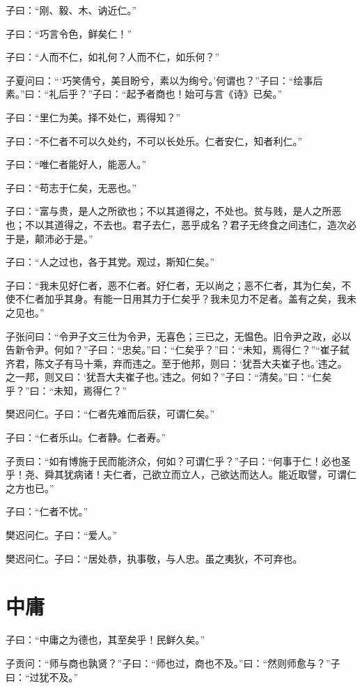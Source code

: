 \documentclass[a5paper]{ctexbook}
\begin{document}
    子曰：“刚、毅、木、讷近仁。”

    子曰：“巧言令色，鲜矣仁！”

    子曰：“人而不仁，如礼何？人而不仁，如乐何？”

    子夏问曰：“‘巧笑倩兮，美目盼兮，素以为绚兮。’何谓也？”子曰：“绘事后素。”曰：“礼后乎？”子曰：“起予者商也！始可与言《诗》已矣。”

    子曰：“里仁为美。择不处仁，焉得知？”

    子曰：“不仁者不可以久处约，不可以长处乐。仁者安仁，知者利仁。”

    子曰：“唯仁者能好人，能恶人。”

    子曰：“苟志于仁矣，无恶也。”

    子曰：“富与贵，是人之所欲也；不以其道得之，不处也。贫与贱，是人之所恶也；不以其道得之，不去也。君子去仁，恶乎成名？君子无终食之间违仁，造次必于是，颠沛必于是。”

    子曰：“人之过也，各于其党。观过，斯知仁矣。”

    子曰：“我未见好仁者，恶不仁者。好仁者，无以尚之；恶不仁者，其为仁矣，不使不仁者加乎其身。有能一日用其力于仁矣乎？我未见力不足者。盖有之矣，我未之见也。”

    子张问曰：“令尹子文三仕为令尹，无喜色；三已之，无愠色。旧令尹之政，必以告新令尹。何如？”子曰：“忠矣。”曰：“仁矣乎？”曰：“未知，焉得仁？”“崔子弑齐君，陈文子有马十乘，弃而违之。至于他邦，则曰：‘犹吾大夫崔子也。’违之。之一邦，则又曰：‘犹吾大夫崔子也。’违之。何如？”子曰：“清矣。”曰：“仁矣乎？”曰：“未知，焉得仁？”

    樊迟问仁。子曰：“仁者先难而后获，可谓仁矣。”

    子曰：“仁者乐山。仁者静。仁者寿。”

    子贡曰：“如有博施于民而能济众，何如？可谓仁乎？”子曰：“何事于仁！必也圣乎！尧、舜其犹病诸！夫仁者，己欲立而立人，己欲达而达人。能近取譬，可谓仁之方也已。”

    子曰：“仁者不忧。”

    樊迟问仁。子曰：“爱人。”

    樊迟问仁。子曰：“居处恭，执事敬，与人忠。虽之夷狄，不可弃也。

    \chapter{中庸}

    子曰：“中庸之为德也，其至矣乎！民鲜久矣。”

    子贡问：“师与商也孰贤？”子曰：“师也过，商也不及。”曰：“然则师愈与？”子曰：“过犹不及。”
\end{document}
